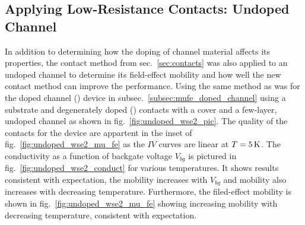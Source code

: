 \subsection{Applying Low-Resistance Contacts: Undoped Channel}\label{subsec:mufe_undoped_channel}
In addition to determining how the doping of channel material affects its properties, the contact method from sec.~\ref{sec:contacts} was also applied to an undoped channel to determine its field-effect mobility and how well the new contact method can improve the performance. Using the same method as was for the doped channel (\lightlyone) device in subsec.~\ref{subsec:mufe_doped_channel} using a \hbn substrate and degenerately doped (\degenerate) contacts with a \hbn cover and a few-layer, undoped  channel as shown in fig.~\ref{fig:undoped_wse2_pic}. The quality of the contacts for the device are appartent in the inset of fig.~\ref{fig:undoped_wse2_mu_fe} as the $IV$ curves are linear at $T=5\,\mathrm{K}$. The conductivity as a function of backgate voltage $V_{bg}$ is pictured in fig.~\ref{fig:undoped_wse2_conduct} for various temperatures. It shows results consistent with expectation, the mobility increases with $V_{bg}$ and mobility also increases with decreasing temperature. Furthermore, the filed-effect mobility is shown in fig.~\ref{fig:undoped_wse2_mu_fe} showing increasing mobility with decreasing temperature, consistent with expectation. 
